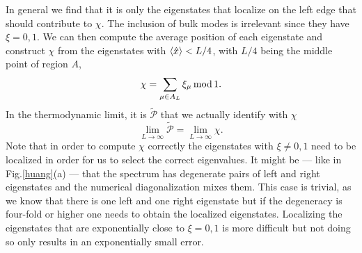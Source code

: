 \documentclass[twocolumn,amsmath,longbibliography,amssymb,superscriptaddress]{revtex4-1}
\begin{document}
In general we find that it is only the eigenstates that localize on the left edge that should contribute to $\chi$. The inclusion of bulk modes is irrelevant since they have $\xi = 0,1$. We can then compute the average position of each eigenstate and construct $\chi$ from the eigenstates with $\expval{\hat{x}}<L/4$, with $L/4$ being the middle point of region $A$,
\begin{equation}
\chi = \sum_{\mu \in A_L} \xi_\mu \, {\rm mod} \, 1. 
\label{eq:chi_left}
\end{equation}
In the thermodynamic limit, it is $\tilde{\mathcal{P}}$ that we actually identify with $\chi$
\begin{equation}
\lim_{L \rightarrow \infty} \tilde{\mathcal{P}} = \lim_{L \rightarrow \infty} \chi.
\label{eq:ptilde_eq_chi}
\end{equation}
Note that in order to compute $\chi$ correctly the eigenstates with $\xi \neq 0,1$ need to be localized in order for us to select the correct eigenvalues. It might be --- like in Fig.\ref{huang}(a) --- that the spectrum has degenerate pairs of left and right eigenstates and the numerical diagonalization mixes them. This case is trivial, as we know that there is one left and one right eigenstate but if the degeneracy is four-fold or higher one needs to obtain the localized eigenstates. Localizing the eigenstates that are exponentially close to $\xi = 0,1$ is more difficult but not doing so only results in an exponentially small error. 
\end{document}
